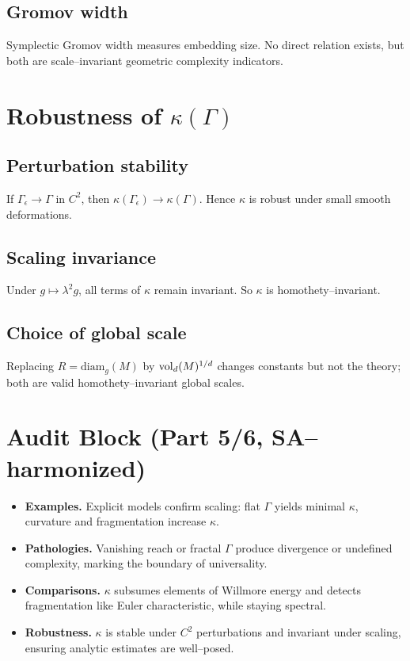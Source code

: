 \subsection{Gromov width}
Symplectic Gromov width measures embedding size. No direct relation exists, but both are scale–invariant geometric complexity indicators.

\section{Robustness of $\kappa(\Gamma)$}
\label{sec:robustness}

\subsection{Perturbation stability}
If $\Gamma_\epsilon\to \Gamma$ in $C^2$, then $\kappa(\Gamma_\epsilon)\to \kappa(\Gamma)$. Hence $\kappa$ is robust under small smooth deformations.

\subsection{Scaling invariance}
Under $g\mapsto \lambda^2 g$, all terms of $\kappa$ remain invariant. So $\kappa$ is homothety–invariant.

\subsection{Choice of global scale}
Replacing $R=\mathrm{diam}_g(M)$ by $\operatorname{vol}_d(M)^{1/d}$ changes constants but not the theory; both are valid homothety–invariant global scales.

\section{Audit Block (Part 5/6, SA–harmonized)}
\label{sec:audit-part5}

\begin{itemize}
\item \textbf{Examples.} Explicit models confirm scaling: flat $\Gamma$ yields minimal $\kappa$, curvature and fragmentation increase $\kappa$.
\item \textbf{Pathologies.} Vanishing reach or fractal $\Gamma$ produce divergence or undefined complexity, marking the boundary of universality.
\item \textbf{Comparisons.} $\kappa$ subsumes elements of Willmore energy and detects fragmentation like Euler characteristic, while staying spectral.
\item \textbf{Robustness.} $\kappa$ is stable under $C^2$ perturbations and invariant under scaling, ensuring analytic estimates are well–posed.
\end{itemize}

